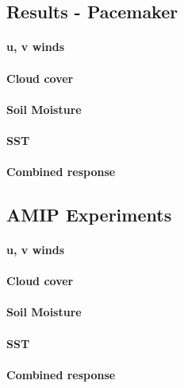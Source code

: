 \subsection{Results - Pacemaker}
\paragraph{u, v winds}
\paragraph{Cloud cover}
\paragraph{Soil Moisture}
\paragraph{SST}
\paragraph{Combined response}


\subsection{AMIP Experiments}

\paragraph{u, v winds}
\paragraph{Cloud cover}
\paragraph{Soil Moisture}
\paragraph{SST}
\paragraph{Combined response}


\processdelayedfloats

